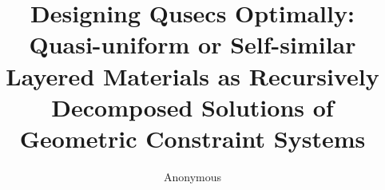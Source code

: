 \documentclass[3p]{elsarticle}
\begin{document}
%
%
\title{Designing Qusecs Optimally:
Quasi-uniform or Self-similar Layered Materials as
Recursively Decomposed Solutions of Geometric Constraint
Systems}

%
%

%
%


\author{Anonymous}

%
%











%
%


\maketitle
\end{document}

